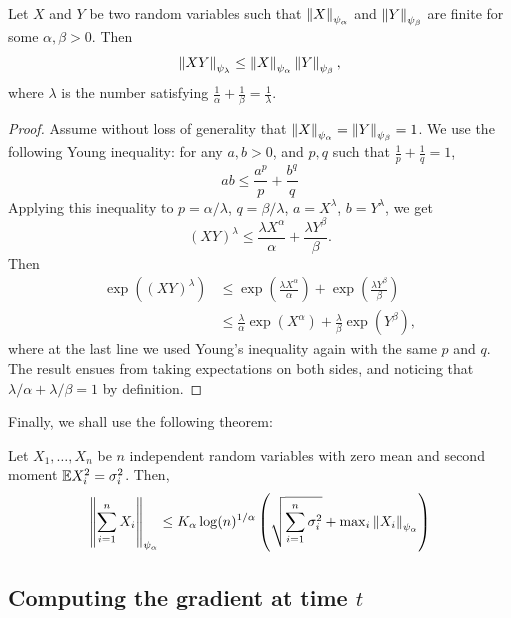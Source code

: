  \begin{lemma}\label{2406:lem:app:orlicz_submult}
     Let $X$ and $Y$ be two random variables such that $\left\lVert X\right\rVert_{\psi_\alpha}$ and $\left\lVert Y\right\rVert_{\psi_\beta}$ are finite for some $\alpha, \beta > 0$. Then
    \[\left\lVert XY\right\rVert_{\psi_{\lambda}} \leq \left\lVert X\right\rVert_{\psi_\alpha} \left\lVert Y\right\rVert_{\psi_\beta},\]
    where $\lambda$ is the number satisfying $\frac1\alpha + \frac1\beta = \frac1\lambda$.
\end{lemma}
\begin{proof}
    Assume without loss of generality that $\left\lVert X\right\rVert_{\psi_\alpha} = \left\lVert Y\right\rVert_{\psi_\beta} = 1$.
    We use the following Young inequality: for any $a, b > 0$, and $p, q$ such that $\frac1p + \frac1q = 1$,
    \[ab \leq \frac{a^p}{p} + \frac{b^{q}}{q}\]
    Applying this inequality to $p= \alpha/\lambda$, $q = \beta/\lambda$, $a = X^\lambda$, $b = Y^\lambda$, we get
    \[ (XY)^\lambda \leq \frac{\lambda X^\alpha}{\alpha} + \frac{\lambda Y^\beta}{\beta}. \]
    Then
    \begin{align*}
        \exp((XY)^\lambda) &\leq \exp\left( \frac{\lambda X^\alpha}{\alpha}\right) + \exp\left(\frac{\lambda Y^\beta}{\beta} \right)\\
        &\leq \frac{\lambda}{\alpha} \exp(X^\alpha) + \frac{\lambda}{\beta} \exp(Y^\beta),
    \end{align*}
    where at the last line we used Young's inequality again with the same $p$ and $q$. The result ensues from taking expectations on both sides, and noticing that $\lambda/\alpha + \lambda/\beta = 1$ by definition.
\end{proof}

 Finally, we shall use the following theorem:
 \begin{theorem} \label{2406:thm:app:orlicz_sum}
     Let $X_1, \dots, X_n$ be $n$ independent random variables with zero mean and second moment $\mathbb{E} X_i^2 = \sigma_i^2$. Then,
     \begin{equation}
         \left\lVert \sum_{i=1}^n X_i\right\rVert_{\psi_\alpha} \leq K_\alpha \log(n)^{1/\alpha} \left(\sqrt{\sum_{i=1}^n \sigma_i^2} + {\rm max}_{i}\left\lVert X_i\right\rVert_{\psi_\alpha} \right)
     \end{equation}
 \end{theorem}

\subsection{Computing the gradient at time \texorpdfstring{$t$}{t}}

